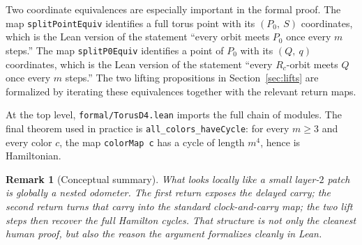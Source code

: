 \documentclass[11pt]{article}
\newtheorem{remark}[theorem]{Remark}
\newcommand{\Pzero}{P_0}
\newcommand{\Qslice}{Q}
\begin{document}
Two coordinate equivalences are especially important in the formal proof. The map
\texttt{splitPoint}\allowbreak\texttt{Equiv} identifies a full torus point with
its $(\Pzero,\ S)$ coordinates, which is the Lean version of the statement
``every orbit meets $\Pzero$ once every $m$ steps.'' The map
\texttt{splitP0}\allowbreak\texttt{Equiv} identifies a point of $\Pzero$ with
its $(\Qslice,\ q)$ coordinates, which is the Lean version of the statement
``every $R_c$-orbit meets $\Qslice$ once every $m$ steps.'' The two lifting
propositions in Section~\ref{sec:lifts} are formalized by iterating these
equivalences together with the relevant return maps.

At the top level, \texttt{formal/TorusD4.lean} imports the full chain of modules.
The final theorem used in practice is \texttt{all\_colors\_haveCycle}: for every
$m \ge 3$ and every color $c$, the map \texttt{colorMap c} has a cycle of length
$m^4$, hence is Hamiltonian.

\begin{remark}[Conceptual summary]
What looks locally like a small layer-$2$ patch is globally a nested odometer.
The first return exposes the delayed carry; the second return turns that carry
into the standard clock-and-carry map; the two lift steps then recover the full
Hamilton cycles. That structure is not only the cleanest human proof, but also the
reason the argument formalizes cleanly in Lean.
\end{remark}
\end{document}
